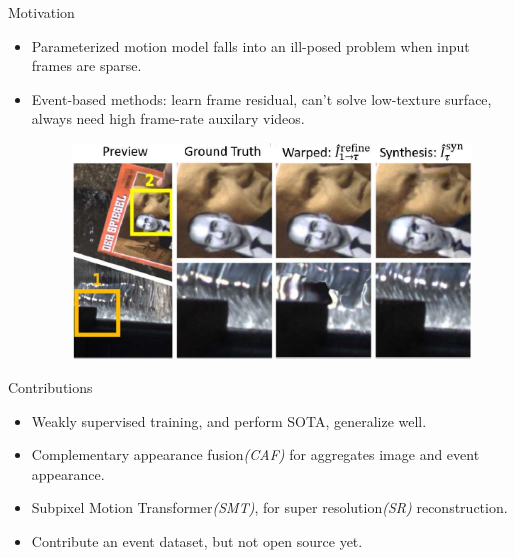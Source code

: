 \documentclass[aspectratio=43]{beamer}
\begin{document}
	\begin{frame}{Motivation}
		\begin{itemize}
			\item Parameterized \alert{motion model} falls into an ill-posed problem when input frames are \alert{sparse}.
			\item Event-based methods: learn \alert{frame residual}, can't solve \alert{low-texture surface}, always need high frame-rate auxilary videos.
			\begin{figure}
				\centering\includegraphics[width=0.7\linewidth]{images/warping_based_vs_event_based.png}
			\end{figure}
		\end{itemize}
	\end{frame}
	
	\begin{frame}{Contributions}
		\begin{itemize}
			\item Weakly supervised training, and perform SOTA, generalize well.
			\item Complementary appearance fusion\textit{(CAF)} for aggregates image and event appearance.
			\item Subpixel Motion Transformer\textit{(SMT)}, for super resolution\textit{(SR)} reconstruction.
			\item Contribute an event dataset, but not open source yet.
		\end{itemize}
	\end{frame}
	
\end{document}
